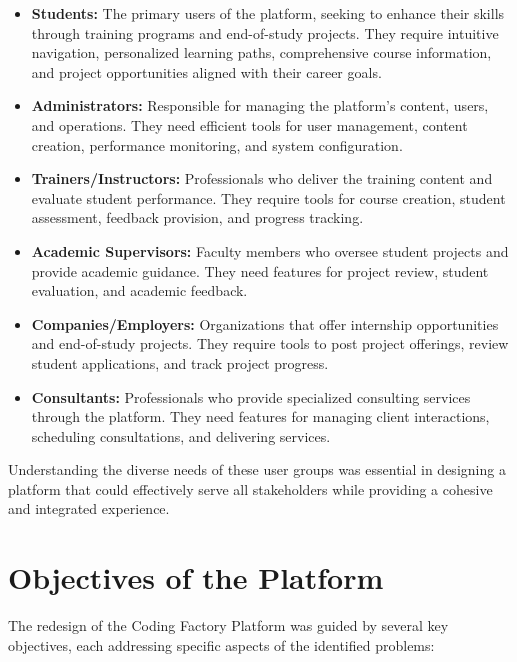 \documentclass[12pt,a4paper]{report}
\begin{document}
\begin{itemize}
    \item \textbf{Students:} The primary users of the platform, seeking to enhance their skills through training programs and end-of-study projects. They require intuitive navigation, personalized learning paths, comprehensive course information, and project opportunities aligned with their career goals.

    \item \textbf{Administrators:} Responsible for managing the platform's content, users, and operations. They need efficient tools for user management, content creation, performance monitoring, and system configuration.

    \item \textbf{Trainers/Instructors:} Professionals who deliver the training content and evaluate student performance. They require tools for course creation, student assessment, feedback provision, and progress tracking.

    \item \textbf{Academic Supervisors:} Faculty members who oversee student projects and provide academic guidance. They need features for project review, student evaluation, and academic feedback.

    \item \textbf{Companies/Employers:} Organizations that offer internship opportunities and end-of-study projects. They require tools to post project offerings, review student applications, and track project progress.

    \item \textbf{Consultants:} Professionals who provide specialized consulting services through the platform. They need features for managing client interactions, scheduling consultations, and delivering services.
\end{itemize}

Understanding the diverse needs of these user groups was essential in designing a platform that could effectively serve all stakeholders while providing a cohesive and integrated experience.

\section{Objectives of the Platform}
The redesign of the Coding Factory Platform was guided by several key objectives, each addressing specific aspects of the identified problems:
\end{document}
